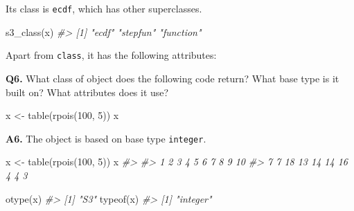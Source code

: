 \documentclass[
]{book}
\newenvironment{Shaded}{\begin{snugshade}}{\end{snugshade}}
\newcommand{\CommentTok}[1]{\textcolor[rgb]{0.56,0.35,0.01}{\textit{#1}}}
\newcommand{\DecValTok}[1]{\textcolor[rgb]{0.00,0.00,0.81}{#1}}
\newcommand{\FunctionTok}[1]{\textcolor[rgb]{0.00,0.00,0.00}{#1}}
\newcommand{\NormalTok}[1]{#1}
\newcommand{\OtherTok}[1]{\textcolor[rgb]{0.56,0.35,0.01}{#1}}
\begin{document}
Its class is \texttt{ecdf}, which has other superclasses.

\begin{Shaded}
\begin{Highlighting}[]
\FunctionTok{s3\_class}\NormalTok{(x)}
\CommentTok{\#\textgreater{} [1] "ecdf"     "stepfun"  "function"}
\end{Highlighting}
\end{Shaded}

Apart from \texttt{class}, it has the following attributes:

\begin{Shaded}
\end{Shaded}

\textbf{Q6.} What class of object does the following code return? What base type is it built on? What attributes does it use?

\begin{Shaded}
\begin{Highlighting}[]
\NormalTok{x }\OtherTok{\textless{}{-}} \FunctionTok{table}\NormalTok{(}\FunctionTok{rpois}\NormalTok{(}\DecValTok{100}\NormalTok{, }\DecValTok{5}\NormalTok{))}
\NormalTok{x}
\end{Highlighting}
\end{Shaded}

\textbf{A6.} The object is based on base type \texttt{integer}.

\begin{Shaded}
\begin{Highlighting}[]
\NormalTok{x }\OtherTok{\textless{}{-}} \FunctionTok{table}\NormalTok{(}\FunctionTok{rpois}\NormalTok{(}\DecValTok{100}\NormalTok{, }\DecValTok{5}\NormalTok{))}
\NormalTok{x}
\CommentTok{\#\textgreater{} }
\CommentTok{\#\textgreater{}  1  2  3  4  5  6  7  8  9 10 }
\CommentTok{\#\textgreater{}  7  7 18 13 14 14 16  4  4  3}

\FunctionTok{otype}\NormalTok{(x)}
\CommentTok{\#\textgreater{} [1] "S3"}
\FunctionTok{typeof}\NormalTok{(x)}
\CommentTok{\#\textgreater{} [1] "integer"}
\end{Highlighting}
\end{Shaded}
\end{document}
